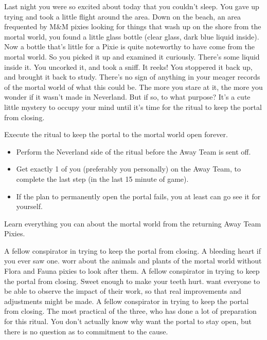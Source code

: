 \documentclass[char]{PP}
\begin{document}
Last night you were so excited about today that you couldn’t sleep. You gave up trying and took a little flight around the area. Down on the beach, an area frequented by M&M pixies looking for things that wash up on the shore from the mortal world, you found a little glass bottle (clear glass, dark blue liquid inside). Now a bottle that’s little for a Pixie is quite noteworthy to have come from the mortal world. So you picked it up and examined it curiously. There’s some liquid inside it. You uncorked it, and took a sniff. It reeks! You stoppered it back up, and brought it back to study. There’s no sign of anything in your meager records of the mortal world of what this could be. The more you stare at it, the more you wonder if it wasn’t made in Neverland. But if so, to what purpose? It’s a cute little mystery to occupy your mind until it’s time for the ritual to keep the portal from closing.


\begin{itemz}
	\item Execute the ritual to keep the portal to the mortal world open forever.
	\begin{itemize}
		\item Perform the Neverland side of the ritual before the Away Team is sent off.
		\item Get exactly 1 of you (preferably you personally) on the Away Team, to complete the last step (in the last 15 minute of game).
		\item If the plan to permanently open the portal fails, you at least can go see it for yourself.
	\end{itemize}
	\item Learn everything you can about the mortal world from the returning Away Team Pixies.
\end{itemz}

\begin{itemz}[Notes]
	\item 
\end{itemz}

\begin{contacts}
	\contact{\cFHeart{}} A fellow conspirator in trying to keep the portal from closing. A bleeding heart if you ever saw one. \cFHeart{\They} worr\cFHeart{\plualy} about the animals and plants of the mortal world without Flora and Fauna pixies to look after them.
	\contact{\cESweet{}} A fellow conspirator in trying to keep the portal from closing. Sweet enough to make your teeth hurt. \cESweet{\They} want\cESweet{\plurals} everyone to be able to observe the impact of their work, so that real improvements and adjustments might be made.
	\contact{\cMIron{}} A fellow conspirator in trying to keep the portal from closing. The most practical of the three, who has done a lot of preparation for this ritual. You don’t actually know why \cMIron{\they} want the portal to stay open, but there is no question as to \cMIron{\their} commitment to the cause.
\end{contacts}
\end{document}
